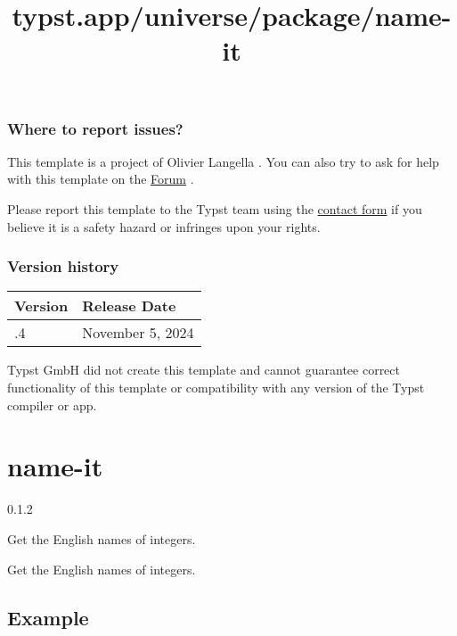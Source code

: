 \subsubsection{Where to report issues?}\label{where-to-report-issues}

This template is a project of Olivier Langella . You can also try to ask
for help with this template on the \href{https://forum.typst.app}{Forum}
.

Please report this template to the Typst team using the
\href{https://typst.app/contact}{contact form} if you believe it is a
safety hazard or infringes upon your rights.

\label{versions}
\subsubsection{Version history}\label{version-history}

\begin{longtable}[]{@{}ll@{}}
\toprule\noalign{}
Version & Release Date \\
\midrule\noalign{}
\endhead
\bottomrule\noalign{}
\endlastfoot
0.0.4 & November 5, 2024 \\
\end{longtable}

Typst GmbH did not create this template and cannot guarantee correct
functionality of this template or compatibility with any version of the
Typst compiler or app.


\title{typst.app/universe/package/name-it}

\label{banner}
\section{name-it}\label{name-it}

{ 0.1.2 }

Get the English names of integers.

\label{readme}
Get the English names of integers.

\subsection{Example}\label{example}


